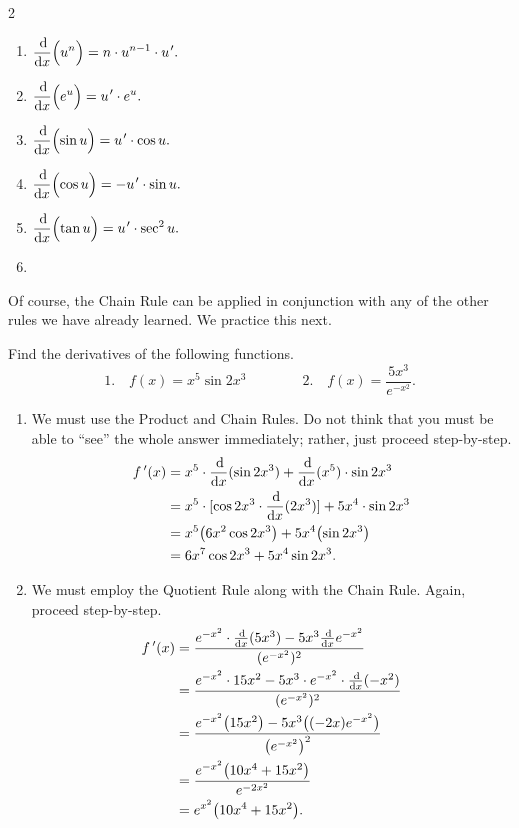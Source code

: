 \begin{multicols}{2}
\begin{enumerate}
	\item	$\ds\frac{\dd}{\dd x}\Bigl(u^n\Bigr) = n\cdot u^{n-1}\cdot u\primeskip'.$
	\item	$\ds\frac{\dd}{\dd x}\Bigl(e^u\Bigr) = u\primeskip'\cdot e^u.$
	\item	$\ds\frac{\dd}{\dd x}\Bigl(\sin u\Bigr) = u\primeskip'\cdot \cos u.$
	\item	$\ds\frac{\dd}{\dd x}\Bigl(\cos u\Bigr) = -u\primeskip'\cdot \sin u.$
	\item	$\ds\frac{\dd}{\dd x}\Bigl(\tan u\Bigr) = u\primeskip'\cdot \sec^2 u.$
	\item[]\bigskip
\end{enumerate}
\end{multicols}

Of course, the Chain Rule can be applied in conjunction with any of the other rules we have already learned. We practice this next.

\begin{example}\label{ex_chain4}%
Find the derivatives of the following functions.
\[
 1.\quad f(x) = x^5 \sin{2x^3} \qquad\qquad 2.\quad f(x) = \dfrac{5x^3}{e^{-x^2}}.
\]
\solution
\begin{enumerate}
\item	We must use the Product and Chain Rules. Do not think that you must be able to ``see'' the whole answer immediately; rather, just proceed step-by-step.
\begin{align*}
 f\,'(x)
 &= x^5 \cdot \frac{\operatorname{d}\!}{\operatorname{d}\! x}(\sin 2x^3) + \frac{\operatorname{d}\!}{\operatorname{d}\! x}(x^5) \cdot \sin 2x^3\\
 &= x^5 \cdot [\cos 2x^3 \cdot \frac{\operatorname{d}\!}{\operatorname{d}\! x}(2x^3)] + 5x^4 \cdot \sin 2x^3\\
 &= x^5\bigl(6x^2\cos 2x^3\bigr) + 5x^4\bigl(\sin 2x^3\bigr)\\
 &= 6x^7\cos2x^3+5x^4\sin 2x^3.
\end{align*}
\item	We must employ the Quotient Rule along with the Chain Rule. Again, proceed step-by-step.
\begin{align*}
 f\,'(x)
 &= \frac{e^{-x^2} \cdot \frac{\operatorname{d}\!}{\operatorname{d}\! x}(5x^3) - 5x^3\frac{\operatorname{d}\!}{\operatorname{d}\! x}e^{-x^2}}{(e^{-x^2})^2}\\
 &= \frac{e^{-x^2} \cdot 15x^2 - 5x^3 \cdot e^{-x^2} \cdot \frac{\operatorname{d}\!}{\operatorname{d}\! x}(-x^2)}{(e^{-x^2})^2}\\
 &= \frac{e^{-x^2}\bigl(15x^2\bigr) - 5x^3\bigl((-2x)e^{-x^2}\bigr)}{\bigl(e^{-x^2}\bigr)^2}\\
 &=\frac{e^{-x^2}\bigl(10x^4+15x^2\bigr)}{e^{-2x^2}}\\
 &= e^{x^2}\bigl(10x^4+15x^2\bigr).
\end{align*}
\end{enumerate}
\end{example}

